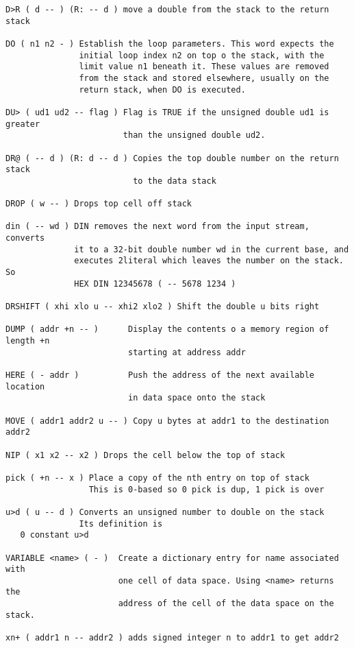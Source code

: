 \begin{verbatim}
D>R ( d -- ) (R: -- d ) move a double from the stack to the return stack

DO ( n1 n2 - ) Establish the loop parameters. This word expects the
               initial loop index n2 on top o the stack, with the
               limit value n1 beneath it. These values are removed
               from the stack and stored elsewhere, usually on the
               return stack, when DO is executed. 

DU> ( ud1 ud2 -- flag ) Flag is TRUE if the unsigned double ud1 is greater
                        than the unsigned double ud2.

DR@ ( -- d ) (R: d -- d ) Copies the top double number on the return stack
                          to the data stack

DROP ( w -- ) Drops top cell off stack

din ( -- wd ) DIN removes the next word from the input stream, converts
              it to a 32-bit double number wd in the current base, and
              executes 2literal which leaves the number on the stack. So
              HEX DIN 12345678 ( -- 5678 1234 )

DRSHIFT ( xhi xlo u -- xhi2 xlo2 ) Shift the double u bits right

DUMP ( addr +n -- )      Display the contents o a memory region of length +n
                         starting at address addr

HERE ( - addr )          Push the address of the next available location 
                         in data space onto the stack

MOVE ( addr1 addr2 u -- ) Copy u bytes at addr1 to the destination addr2

NIP ( x1 x2 -- x2 ) Drops the cell below the top of stack

pick ( +n -- x ) Place a copy of the nth entry on top of stack
                 This is 0-based so 0 pick is dup, 1 pick is over

u>d ( u -- d ) Converts an unsigned number to double on the stack
               Its definition is 
   0 constant u>d

VARIABLE <name> ( - )  Create a dictionary entry for name associated with
                       one cell of data space. Using <name> returns the
                       address of the cell of the data space on the stack.

xn+ ( addr1 n -- addr2 ) adds signed integer n to addr1 to get addr2

\end{verbatim}

